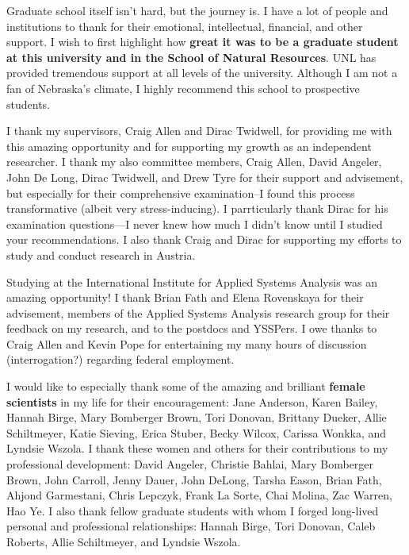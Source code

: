 \documentclass[12pt,twoside,openany]{reedthesis}
\begin{document}
 \begin{acknowledgements}
   Graduate school itself isn't hard, but the journey is. I have a lot of people and institutions to thank for their emotional, intellectual, financial, and other support. I wish to first highlight how \textbf{great it was to be a graduate student at this university and in the School of Natural Resources}. UNL has provided tremendous support at all levels of the university. Although I am not a fan of Nebraska's climate, I highly recommend this school to prospective students.
   
   I thank my supervisors, Craig Allen and Dirac Twidwell, for providing me with this amazing opportunity and for supporting my growth as an independent researcher. I thank my also committee members, Craig Allen, David Angeler, John De Long, Dirac Twidwell, and Drew Tyre for their support and advisement, but especially for their comprehensive examination--I found this process transformative (albeit very stress-inducing). I parrticularly thank Dirac for his examination questions---I never knew how much I didn't know until I studied your recommendations. I also thank Craig and Dirac for supporting my efforts to study and conduct research in Austria.
   
   Studying at the International Institute for Applied Systems Analysis was an amazing opportunity! I thank Brian Fath and Elena Rovenskaya for their advisement, members of the Applied Systems Analysis research group for their feedback on my research, and to the postdocs and YSSPers. I owe thanks to Craig Allen and Kevin Pope for entertaining my many hours of discussion (interrogation?) regarding federal employment.
   
   I would like to especially thank some of the amazing and brilliant \textbf{female scientists} in my life for their encouragement: Jane Anderson, Karen Bailey, Hannah Birge, Mary Bomberger Brown, Tori Donovan, Brittany Dueker, Allie Schiltmeyer, Katie Sieving, Erica Stuber, Becky Wilcox, Carissa Wonkka, and Lyndsie Wszola. I thank these women and others for their contributions to my professional development: David Angeler, Christie Bahlai, Mary Bomberger Brown, John Carroll, Jenny Dauer, John DeLong, Tarsha Eason, Brian Fath, Ahjond Garmestani, Chris Lepczyk, Frank La Sorte, Chai Molina, Zac Warren, Hao Ye. I also thank fellow graduate students with whom I forged long-lived personal and professional relationships: Hannah Birge, Tori Donovan, Caleb Roberts, Allie Schiltmeyer, and Lyndsie Wszola.
   

\end{acknowledgements}
\end{document}
